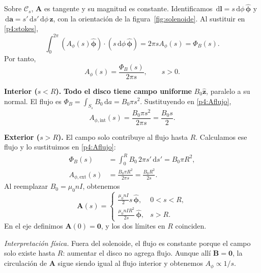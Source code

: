 \documentclass[11pt]{article}
\newcommand{\dd}{\,\mathrm{d}}
\newcommand{\ez}{\hat{\mathbf{z}}}
\newcommand{\ep}{\hat{\boldsymbol{\phi}}}
\newcommand{\ideafisica}[1]{%
  \par\medskip\noindent\textit{Interpretación física.} #1\par}
\begin{document}
Sobre $\mathcal C_s$, $\mathbf A$ es tangente y su magnitud es
constante. Identificamos $\dd\mathbf l=s\dd\phi\,\ep$ y
$\dd\mathbf a=s'\dd s'\dd\phi\,\ez$, con la orientación de la
figura~\ref{fig:solenoide}. Al sustituir en \eqref{p4:stokes},
\[
  \int_0^{2\pi}(A_\phi(s)\ep)\cdot(s\dd\phi\,\ep)
    =2\pi sA_\phi(s)=\Phi_B(s).
\]
Por tanto,
\begin{equation}
  A_\phi(s)=\frac{\Phi_B(s)}{2\pi s},
  \qquad s>0.
  \label{p4:Aflujo}
\end{equation}

\textbf{Interior ($s<R$).}
\textbf{Todo el disco tiene campo uniforme} $B_0\ez$, paralelo a su normal.
El flujo es $\Phi_B=\int_{S_s} B_0\dd a=B_0\pi s^2$.
Sustituyendo en \eqref{p4:Aflujo},
\[
  A_{\phi,\mathrm{int}}(s)
    =\frac{B_0\pi s^2}{2\pi s}
    =\frac{B_0s}{2}.
\]

\textbf{Exterior ($s>R$).}
El campo solo contribuye al flujo hasta $R$. Calculamos ese flujo
y lo sustituimos en \eqref{p4:Aflujo}:
\begin{align*}
  \Phi_B(s)
    &=\int_0^R B_0\,2\pi s'\dd s'
      =B_0\pi R^2,\\
  A_{\phi,\mathrm{ext}}(s)
    &=\frac{B_0\pi R^2}{2\pi s}
      =\frac{B_0R^2}{2s}.
\end{align*}
Al reemplazar $B_0=\mu_0nI$, obtenemos
\begin{equation}
  \boxed{
    \mathbf A(s)=
    \begin{cases}
      \displaystyle\frac{\mu_0 nI}{2}s\,\ep,
        &0<s<R,\\[7pt]
      \displaystyle\frac{\mu_0 nIR^2}{2s}\,\ep,
        &s>R.
    \end{cases}
  }
  \label{p4:A}
\end{equation}
En el eje definimos $\mathbf A(0)=\mathbf0$, y los dos límites
en $R$ coinciden.
\ideafisica{Fuera del solenoide, el flujo es constante porque
el campo solo existe hasta $R$: aumentar el disco no agrega
flujo. Aunque allí $\mathbf B=\mathbf0$, la circulación de
$\mathbf A$ sigue siendo igual al flujo interior y obtenemos
$A_\phi\propto1/s$.}
\end{document}
